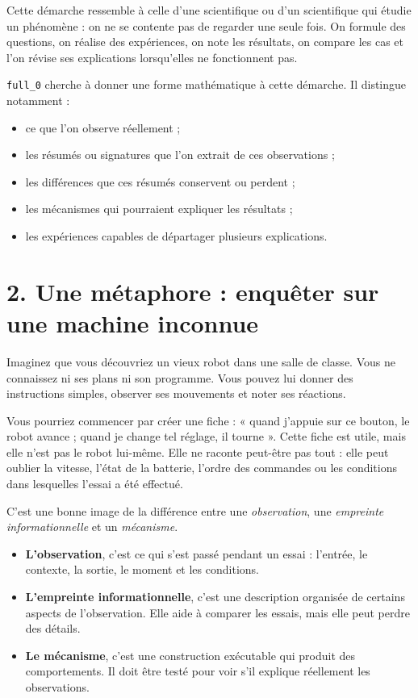 \documentclass[11pt,a4paper]{article}
\begin{document}
Cette démarche ressemble à celle d'une scientifique ou d'un scientifique qui étudie un phénomène : on ne se contente pas de regarder une seule fois. On formule des questions, on réalise des expériences, on note les résultats, on compare les cas et l'on révise ses explications lorsqu'elles ne fonctionnent pas.

\texttt{full\_0} cherche à donner une forme mathématique à cette démarche. Il distingue notamment :
\begin{itemize}[leftmargin=1.4em]
  \item ce que l'on observe réellement ;
  \item les résumés ou signatures que l'on extrait de ces observations ;
  \item les différences que ces résumés conservent ou perdent ;
  \item les mécanismes qui pourraient expliquer les résultats ;
  \item les expériences capables de départager plusieurs explications.
\end{itemize}

\section*{2. Une métaphore : enquêter sur une machine inconnue}

Imaginez que vous découvriez un vieux robot dans une salle de classe. Vous ne connaissez ni ses plans ni son programme. Vous pouvez lui donner des instructions simples, observer ses mouvements et noter ses réactions.

Vous pourriez commencer par créer une fiche : « quand j'appuie sur ce bouton, le robot avance ; quand je change tel réglage, il tourne ». Cette fiche est utile, mais elle n'est pas le robot lui-même. Elle ne raconte peut-être pas tout : elle peut oublier la vitesse, l'état de la batterie, l'ordre des commandes ou les conditions dans lesquelles l'essai a été effectué.

C'est une bonne image de la différence entre une \emph{observation}, une \emph{empreinte informationnelle} et un \emph{mécanisme}.

\begin{itemize}[leftmargin=1.4em]
  \item \textbf{L'observation}, c'est ce qui s'est passé pendant un essai : l'entrée, le contexte, la sortie, le moment et les conditions.
  \item \textbf{L'empreinte informationnelle}, c'est une description organisée de certains aspects de l'observation. Elle aide à comparer les essais, mais elle peut perdre des détails.
  \item \textbf{Le mécanisme}, c'est une construction exécutable qui produit des comportements. Il doit être testé pour voir s'il explique réellement les observations.
\end{itemize}
\end{document}
